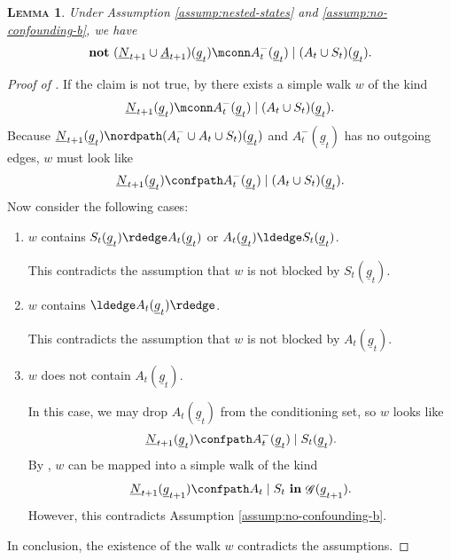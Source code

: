 \documentclass[12pt,a4paper]{article}
\newtheorem{lemma}[theorem]{\normalfont\scshape  Lemma}
\theoremstyle{definition}
\newcommand{\ingraph}[1]{~\textnormal{\bf in}\,#1}
\newcommand{\textnot}{\textnormal{\bf not}~}
\DeclareMathOperator{\gG}{\mathscr{G}}
\begin{document}
\begin{lemma}\label{lemma:innovation_action_unconfoundedness_gt_graph}
  Under Assumption \ref{assump:nested-states} and \ref{assump:no-confounding-b}, we have
    \begin{align*}
        \textnot (\underline{N}_{t+1} \cup \underline{A}_{t+1})(\underline{g}_t) \mconn A^{-}_t(\underline{g}_t) \mid (A_t \cup S_t)(\underline{g}_t).
    \end{align*}
\end{lemma}
\begin{proof}[Proof of
  ]
  If the claim is not true, by  there exists
  a simple walk $w$ of the kind
  \[
    \underline{N}_{t+1}(\underline{g}_t) \mconn
    A^{-}_t(\underline{g}_t) \mid (A_t \cup S_t)(\underline{g}_t).
  \]
  Because $\underline{N}_{t+1}(\underline{g}_t) \nordpath (A_t^- \cup
  A_t \cup S_t)(\underline{g}_t)$ and $A^{-}_t(\underline{g}_t)$ has
  no outgoing edges, $w$ must look like
  \[
    \underline{N}_{t+1}(\underline{g}_t) \confpath
    A^{-}_t(\underline{g}_t) \mid (A_t \cup S_t)(\underline{g}_t).
  \]
  Now consider the following cases:
    \begin{enumerate}
        \item $w$ contains $S_t(\underline{g}_t) \rdedge
          A_t(\underline{g}_t)$ or $A_t(\underline{g}_t) \ldedge
          S_t(\underline{g}_t)$.

        This contradicts the assumption that $w$ is not blocked by
        $S_t(\underline{g}_t)$.

      \item $w$ contains $\ldedge A_t(\underline{g}_t) \rdedge $.

        This contradicts the assumption that $w$ is not blocked by
        $A_t(\underline{g}_t)$.

      \item $w$ does not contain $A_t(\underline{g}_t)$.

        In this case, we may drop $A_t(\underline{g}_t)$ from the
        conditioning set, so $w$ looks like
        \[
          \underline{N}_{t+1}(\underline{g}_t) \confpath
        A^{-}_t(\underline{g}_t) \mid S_t(\underline{g}_t).
      \]
      By , $w$ can be mapped into a simple
      walk of the kind
        \[
            \underline{N}_{t+1}(\underline{g}_{t+1}) \confpath A_t \mid S_t \ingraph{\gG(\underline{g}_{t+1})}.
        \]
        However, this contradicts Assumption \ref{assump:no-confounding-b}.
    \end{enumerate}
    In conclusion, the existence of the walk $w$ contradicts the
    assumptions.
\end{proof}
\end{document}
